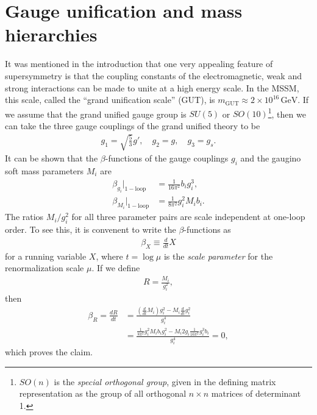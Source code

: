 \documentclass[twoside,english]{uiofysmaster}
\begin{document}
 \section{Gauge unification and mass hierarchies}
 It was mentioned in the introduction that one very appealing feature of supersymmetry is that the coupling constants of the electromagnetic, weak and strong interactions can be made to unite at a high energy scale. In the MSSM, this scale, called the ``grand unification scale'' (GUT), is $m_\mathrm{GUT} \approx 2\times 10^{16} \,\mathrm{GeV}$. If we assume that the grand unified gauge group is $SU(5)$ or $SO(10)$\footnote{$SO(n)$ is the {\it special orthogonal group}, given in the defining matrix representation as the group of all orthogonal $n\times n$ matrices of determinant 1.}, then we can take the three gauge couplings of the grand unified theory to be \cite{Batzing:2013}
 \begin{align}
 	g_1 = \sqrt{\frac{5}{3}}g', \quad g_2 = g, \quad g_3 = g_s.
 \end{align}
 It can be shown that the $\beta$-functions of the gauge couplings $g_i$ and the gaugino soft mass parameters $M_i$ are
 \begin{align}
 	\beta_{g_i}|_\mathrm{1-loop} &= \frac{1}{16\pi^2} b_i g_i^3,\\
 	\beta_{M_i} |_\mathrm{1-loop} &= \frac{1}{8\pi^2}g_i^2 M_i b_i.
 \end{align}
The ratios $M_i/g_i^2$ for all three parameter pairs are scale independent at one-loop order. To see this, it is convenent to write the $\beta$-functions as 
 \begin{align}
 	\beta_X \equiv \frac{d}{dt}X
 \end{align}
 for a running variable $X$, where $t = \log \mu$ is the {\it scale parameter} for the renormalization scale $\mu$. If we define
 \begin{align}
 	R = \frac{M_i}{g_i^2},
 \end{align}
 then
 \begin{align}
 	\beta_R = \frac{dR}{dt} &= \frac{(\frac{d}{dt}M_i)g_i^2 - M_i\frac{d}{dt}g_i^2}{g_i^4} \\
 	&= \frac{\frac{1}{8\pi^2}g_i^2M_i b_i g_i^2 - M_i 2g_i \frac{1}{16\pi^2}g_i^3 b_i}{g_i^4} = 0, \nonumber
 \end{align}
 which proves the claim. 
\end{document}
